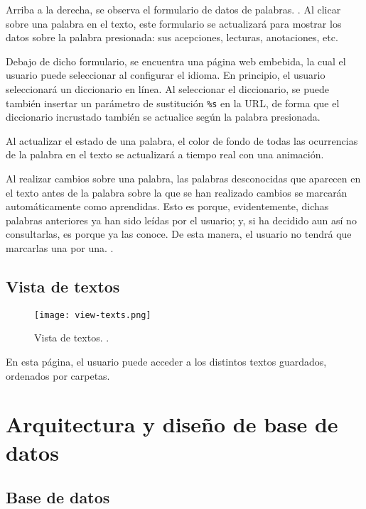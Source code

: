 Arriba a la derecha, se observa el formulario de datos de palabras. . Al clicar sobre una palabra en el texto, este formulario se actualizará para mostrar los datos sobre la palabra presionada: sus acepciones, lecturas, anotaciones, etc.

Debajo de dicho formulario, se encuentra una página web embebida, la cual el usuario puede seleccionar al configurar el idioma. En principio, el usuario seleccionará un diccionario en línea. Al seleccionar el diccionario, se puede también insertar un parámetro de sustitución \texttt{\%s} en la URL, de forma que el diccionario incrustado también se actualice según la palabra presionada.

Al actualizar el estado de una palabra, el color de fondo de todas las ocurrencias de la palabra en el texto se actualizará a tiempo real con una animación.

Al realizar cambios sobre una palabra, las palabras desconocidas que aparecen en el texto antes de la palabra sobre la que se han realizado cambios se marcarán automáticamente como aprendidas. Esto es porque, evidentemente, dichas palabras anteriores ya han sido leídas por el usuario; y, si ha decidido aun así no consultarlas, es porque ya las conoce. De esta manera, el usuario no tendrá que marcarlas una por una. .

\subsection{Vista de textos}

\begin{figure}[H]
	\texttt{[image: view-texts.png]}
	\caption[Vista de textos]{Vista de textos. .}
\end{figure}

En esta página, el usuario puede acceder a los distintos textos guardados, ordenados por carpetas. 


\section{Arquitectura y diseño de base de datos}

\subsection{Base de datos}

